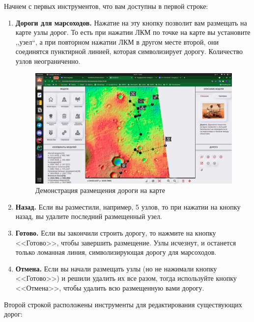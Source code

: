 Начнем с первых инструментов, что вам доступны в первой строке:

\begin{enumerate}
	\item \textbf{Дороги для марсоходов.} Нажатие на эту кнопку позволит вам размещать на карте узлы дорог. То есть при нажатии ЛКМ по точке на карте вы установите ,,узел``, а при повторном нажатии ЛКМ в другом месте второй, они соединятся пунктирной линией, которая символизирует дорогу. Количество узлов неограниченно.
	
	\begin{figure}[h!]
		\centering
		\includegraphics[width=.5\linewidth]{./img/roads_demonstration}
		\caption{Демонстрация размещения дороги на карте}\label{fig:roads_demonstration}
	\end{figure}

	\item \textbf{Назад.} Если вы разместили, например, 5 узлов, то при нажатии на кнопку назад, вы удалите последний размещенный узел.
	\item \textbf{Готово.} Если вы закончили строить дорогу, то нажмите на кнопку <<Готово>>, чтобы завершить размещение. Узлы исчезнут, и останется только ломанная линия, символизирующая дорогу для марсоходов.
	\item \textbf{Отмена.} Если вы начали размещать узлы (но не нажимали кнопку <<Готово>>) и решили удалить их все разом, тогда используйте кнопку <<Отмена>>, чтобы удалить всю размещенную вами дорогу.
\end{enumerate}

Второй строкой расположены инструменты для редактирования существующих дорог:


